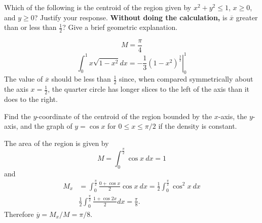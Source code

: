 \documentclass{ximera}
\begin{document}
\begin{question}
Which of the following is  the centroid of the region given by $x^2 + y^2 \leq 1$, $x \geq 0$, and $y \geq 0$? Justify your response.  {\bf Without doing the calculation,} is $\overline{x}$ greater than or less than $\frac{1}{2}$? Give a brief geometric explanation.
\begin{multipleChoice}
\end{multipleChoice}

 \begin{feedback}\[ M = \frac{\pi}{4} \]
\[ \int_0^1 x \sqrt{1-x^2} dx = \left. - \frac{1}{3} (1-x^2)^\frac{3}{2} \right|_{0}^1 \]
The value of $\overline{x}$ should be less than $\frac{1}{2}$ since, when compared symmetrically about the axis $x=\frac{1}{2}$, the quarter circle has longer slices to the left of the axis than it does to the right.
\end{feedback}
\end{question}

\begin{question}%

Find the \(y\)-coordinate of the centroid of the region bounded by the \(x\)-axis, the \(y\)-axis, and the graph of \(y = \cos x\) for \(0 \leq x \leq \pi/2\) if the density is constant.
\begin{multiplechoice}
\end{multiplechoice}
\begin{feedback}
The area of the region is given by
\[ M = \int_0^{\frac{\pi}{2}} \cos x~dx = 1 \]
and 
\[\begin{aligned}
 M_x & = \int_0^{\frac{\pi}{2}} \frac{0 + \cos x}{2} \cos x~ dx = \frac{1}{2} \int_0^{\frac{\pi}{2}} \cos^2 x ~ dx \\
& \frac{1}{2} \int_0^{\frac{\pi}{2}} \frac{1 + \cos 2x}{2} dx = \frac{\pi}{8}. 
\end{aligned}\]
Therefore \(\overline{y} = M_x / M = \pi/8\).
\end{feedback}

\end{question}
\end{document}
